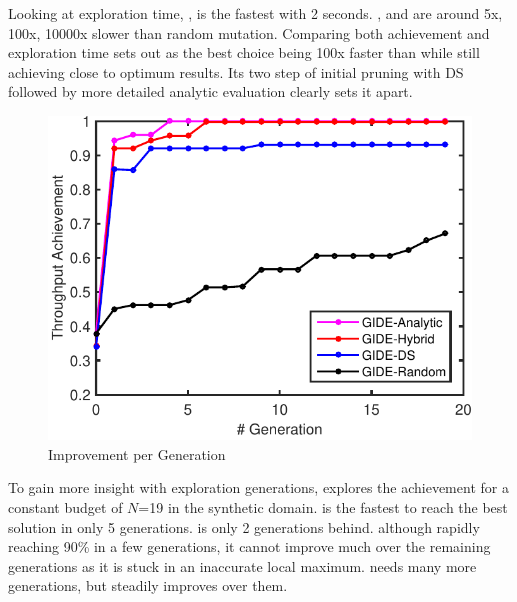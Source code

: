 Looking at exploration time, , \garand is the fastest with 2 seconds. \gads, \gah and \gaana are around 5x, 100x, 10000x slower than random mutation. 
%
Comparing both achievement and exploration time sets out \gah as the best choice being 100x faster than \gaana while still achieving close to optimum results. Its two step of initial pruning with DS followed by more detailed analytic evaluation clearly sets it apart.  


\begingroup
\setlength{\columnsep}{8pt}%

\begin{figure}
	\begin{center}
		\includegraphics[width=\linewidth]{fig/prPAGenSyn.pdf}
	\end{center}
	\caption{Improvement per Generation}
	\label{fig:paGenSyn}
\end{figure}


To gain more insight with exploration generations,  explores the achievement for a constant budget of $N$=19 in the synthetic domain. \gaana is the fastest to reach the best solution in only 5 generations. \gah is only 2 generations behind. \gads although rapidly reaching 90\% in a few generations, it cannot improve much over the remaining generations as it is stuck in an inaccurate local maximum. \garand needs many more generations, but steadily improves over them. 

